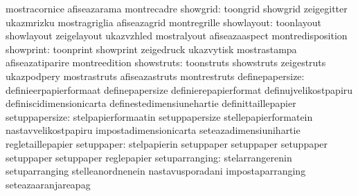                                   mostracornice                    afiseazarama
                                  montrecadre
                        showgrid: toongrid                         showgrid
                                  zeigegitter                      ukazmrizku
                                  mostragriglia                    afiseazagrid
                                  montregrille
                      showlayout: toonlayout                       showlayout
                                  zeigelayout                      ukazvzhled
                                  mostralyout                      afiseazaaspect
                                  montredisposition
                       showprint: toonprint                        showprint
                                  zeigedruck                       ukazvytisk
                                  mostrastampa                     afiseazatiparire
                                  montreedition
                      showstruts: toonstruts                       showstruts
                                  zeigestruts                      ukazpodpery
                                  mostrastruts                     afiseazastruts
                                  montrestruts
                 definepapersize: definieerpapierformaat           definepapersize
                                  definierepapierformat            definujvelikostpapiru
                                  definiscidimensionicarta         definestedimensiunehartie
                                  definittaillepapier
                  setuppapersize: stelpapierformaatin              setuppapersize
                                  stellepapierformatein            nastavvelikostpapiru
                                  impostadimensionicarta           seteazadimensiunihartie
                                  regletaillepapier
                      setuppaper: stelpapierin                     setuppaper
                                  setuppaper                       setuppaper
                                  setuppaper                       setuppaper
                                  reglepapier
                  setuparranging: stelarrangerenin                 setuparranging
                                  stelleanordnenein                nastavusporadani
                                  impostaparranging                seteazaaranjareapag
